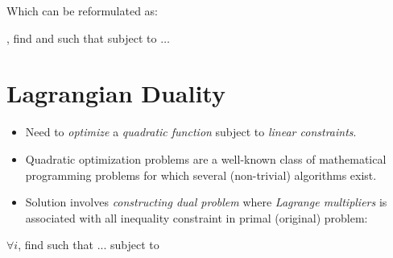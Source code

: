 \documentclass[
	title={SVM}
]{cs584notes}
\begin{document}
Which can be reformulated as:

\begin{svmbox}
	, find  and  such that
	\data{\[ \mbox{\emph{Minimize }} Q(w) = \frac{1}{2}||\vec{w}||^{2} = \frac{1}{2}\vec{w}^{T}\vec{w} \]}
	subject to \data{$~$} $\dots$ %
\end{svmbox}

\section{Lagrangian Duality}\label{sec:lagrangian-duality}
\begin{itemize}
	\item Need to \emph{optimize} a \emph{quadratic function} subject to \emph{linear constraints}.
	\item Quadratic optimization problems are a well-known class of mathematical programming problems for which several (non-trivial) algorithms exist.
	\item Solution involves \emph{constructing dual problem} where \emph{Lagrange multipliers}  is associated with all inequality constraint in primal (original) problem:
\end{itemize}

\begin{svmbox}
	$\forall i$, find  such that ... subject to 
\end{svmbox}
\end{document}
